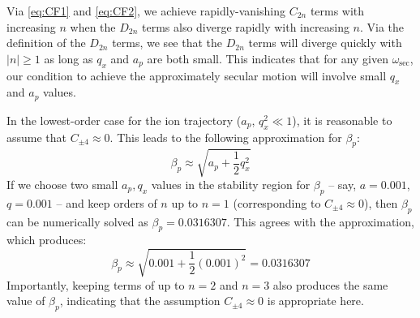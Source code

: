 \documentclass{article}
\begin{document}
\medskip
\noindent Via \eqref{eq:CF1} and \eqref{eq:CF2}, we achieve rapidly-vanishing $C_{2n}$ terms with increasing $n$ when the $D_{2n}$ terms also diverge rapidly with increasing $n$. Via the definition of the $D_{2n}$ terms, we see that the $D_{2n}$ terms will diverge quickly with $|n| \ge 1$ as long as $q_x$ and $a_p$ are both small. This indicates that for any given $\omega_{\text{sec}}$, our condition to achieve the approximately secular motion will involve small $q_x$ and $a_p$ values. \par
\medskip
\noindent In the lowest-order case for the ion trajectory ($a_p$, $q_x^2 \ll 1$), it is reasonable to assume that $C_{\pm 4} \approx 0$. This leads to the following approximation for $\beta_p$:
\begin{equation}
\beta_p \approx \sqrt{a_p + \frac{1}{2}q_x^2}	
\end{equation}
If we choose two small $a_p, q_x$ values in the stability region for $\beta_p$ -- say, $a = 0.001$, $q = 0.001$ -- and keep orders of $n$ up to $n = 1$ (corresponding to $C_{\pm 4} \approx 0$), then $\beta_p$ can be numerically solved as $\beta_p = 0.0316307$. This agrees with the approximation, which produces:
\begin{equation*}
\beta_p \approx \sqrt{0.001 + \frac{1}{2}(0.001)^2} = 0.0316307
\end{equation*}
Importantly, keeping terms of up to $n = 2$ and $n = 3$ also produces the same value of $\beta_p$, indicating that the assumption $C_{\pm 4} \approx 0$ is appropriate here. 
\end{document}
